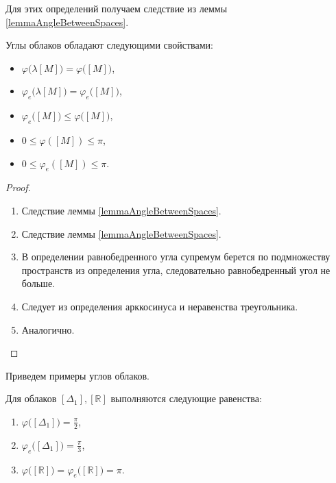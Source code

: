 Для этих определений получаем следствие из леммы \ref{lemmaAngleBetweenSpaces}.
\begin{lemma}
  Углы облаков обладают следующими свойствами:\label{lem:angles}
  \begin{itemize}
    \item \(\varphi \big(\lambda [M]\big) = \varphi
      \big([M]\big)\),\label{lem:angles:1}
    \item \(\varphi_e \big(\lambda [M]\big) = \varphi_e \big([M]\big)\),
    \item \( \varphi_e \big([M]\big) \le \varphi \big([M]\big) \),
    \item \(0 \le \varphi ([M]) \le \pi\),
    \item \(0 \le \varphi_e ([M]) \le \pi\).
  \end{itemize}
\end{lemma}
\begin{proof}
  \begin{enumerate}
    \item Следствие леммы \ref{lemmaAngleBetweenSpaces}.
    \item Следствие леммы \ref{lemmaAngleBetweenSpaces}.
    \item В определении равнобедренного угла супремум берется по
      подмножеству пространств из определения угла, следовательно
      равнобедренный угол не больше.
    \item Следует из определения арккосинуса и неравенства треугольника.
    \item Аналогично.
  \end{enumerate}
\end{proof}
Приведем примеры углов облаков.
\begin{lemma}
  Для облаков \( [\Delta _{1}], [\mathbb{R}] \) выполняются следующие равенства:
  \begin{enumerate}
    \item \( \varphi \big([\Delta _{1}]\big) = \frac{\pi }{2} \),
    \item \( \varphi_e \big([\Delta _{1}]\big) = \frac{\pi }{3} \),
    \item \( \varphi \big([\mathbb{R}]\big) = \varphi_e
      \big([\mathbb{R}]\big) = \pi  \).
  \end{enumerate}
\end{lemma}
